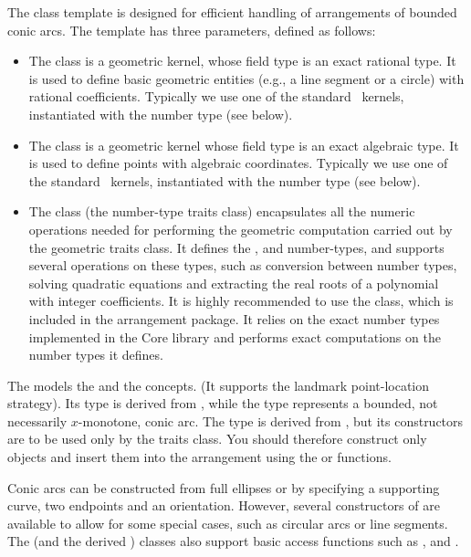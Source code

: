 The  class
template is designed for efficient handling of arrangements of
bounded conic arcs. The template has three parameters, defined as
follows:
\begin{itemize}
\item The  class is a geometric kernel, whose field
type is an exact rational type. It is used to define basic
geometric entities (e.g., a line segment or a circle) with rational
coefficients. Typically we use one of the standard \cgal\ kernels,
instantiated with the number type  (see
below).
%
\item The  class is a geometric kernel whose field
type is an exact algebraic type. It is used to define points with
algebraic coordinates. Typically we use one of the standard
\cgal\ kernels, instantiated with the number type
 (see below).
%
\item The  class (the number-type traits class)
encapsulates all the numeric operations needed for performing the
geometric computation carried out by the geometric traits class.
It defines the ,  and 
number-types, and supports several operations on these types, such
as conversion between number types, solving quadratic equations
and extracting the real roots of a polynomial with integer
coefficients. It is highly recommended to use the
 class, which is included in the
arrangement package. It relies on the exact number types
implemented in the {\sc Core} library and performs exact
computations on the number types it defines.
\end{itemize}

The  models the  and
the  concepts. (It supports
the landmark point-location strategy). Its  type is
derived from , while the 
type represents a bounded, not necessarily $x$-monotone, conic arc.
The  type is derived from ,
but its constructors are to be used only by the traits class.
You should therefore construct only  objects and
insert them into the arrangement using the 
or  functions.

Conic arcs can be constructed from full ellipses or by specifying
a supporting curve, two endpoints and an orientation. However,
several constructors of  are available to allow for some
special cases, such as circular arcs or line segments. The
 (and the derived ) classes
also support basic access functions such as ,
 and .

